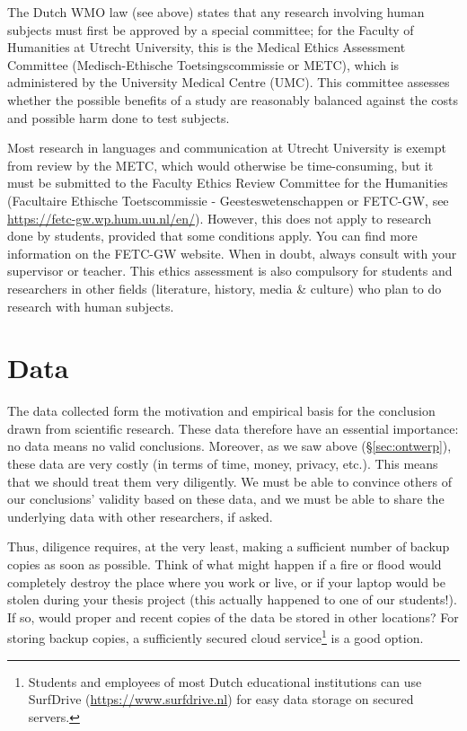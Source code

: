 \documentclass[
]{book}
\begin{document}
The Dutch WMO law (see above) states that any research involving human subjects must first be approved by a special committee; for the Faculty of Humanities at Utrecht University, this is the Medical Ethics Assessment Committee (Medisch-Ethische Toetsingscommissie or METC), which is administered by the University Medical Centre (UMC). This committee assesses whether the possible benefits of a study are reasonably balanced against the costs and possible harm done to test subjects.

Most research in languages and communication at Utrecht University is exempt from review by the METC, which would otherwise be time-consuming, but it must be submitted to the Faculty Ethics Review Committee for the Humanities (Facultaire Ethische Toetscommissie - Geesteswetenschappen or FETC-GW, see \url{https://fetc-gw.wp.hum.uu.nl/en/}).
However, this does not apply to research done by students, provided that some conditions apply.
You can find more information on the FETC-GW website. When in doubt, always consult with your supervisor or teacher.
This ethics assessment is also compulsory for students and researchers in other fields (literature, history, media \& culture) who plan to do research with human subjects.

\hypertarget{data}{%
\section{Data}\label{data}}

The data collected form the motivation and empirical basis for the conclusion drawn from scientific research. These data therefore have an essential importance: no data means no valid conclusions. Moreover, as we saw above (§\ref{sec:ontwerp}), these data are very costly (in terms of time, money, privacy, etc.). This means that we should treat them very diligently. We must be able to convince others of our conclusions' validity based on these data, and we must be able to share the underlying data with other researchers, if asked.

Thus, diligence requires, at the very least, making a sufficient number of backup copies as soon as possible. Think of what might happen if a fire or flood would completely destroy the place where you work or live, or if your laptop would be stolen during your thesis project (this actually happened to one of our students!). If so, would proper and recent copies of the data be stored in other locations? For storing backup copies, a sufficiently secured cloud service\footnote{Students and employees of most Dutch educational institutions can use SurfDrive (\url{https://www.surfdrive.nl}) for easy data storage on secured servers.} is a good option.
\end{document}
